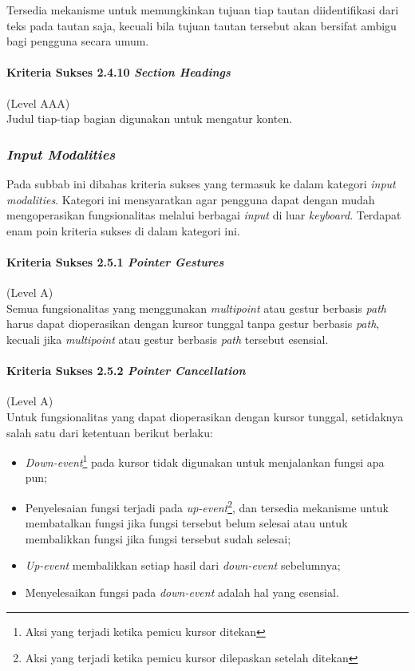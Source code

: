 Tersedia mekanisme untuk memungkinkan tujuan tiap tautan diidentifikasi dari teks pada tautan saja, kecuali bila tujuan tautan tersebut akan bersifat ambigu bagi pengguna secara umum.

\paragraph{Kriteria Sukses 2.4.10 \textit{Section Headings}}
\label{sec:kriteria_sukses_2.4.10}
(Level AAA)\\

Judul tiap-tiap bagian digunakan untuk mengatur konten.

\subsubsection{\textit{Input Modalities}}
\label{sec:input_modalities}
Pada subbab ini dibahas kriteria sukses yang termasuk ke dalam kategori \textit{input modalities}. Kategori ini mensyaratkan agar pengguna dapat dengan mudah mengoperasikan fungsionalitas melalui berbagai \textit{input} di luar \textit{keyboard}. Terdapat enam poin kriteria sukses di dalam kategori ini.

\paragraph{Kriteria Sukses 2.5.1 \textit{Pointer Gestures}}
\label{sec:kriteria_sukses_2.5.1}
(Level A)\\

Semua fungsionalitas yang menggunakan \textit{multipoint} atau gestur berbasis \textit{path} harus dapat dioperasikan dengan kursor tunggal tanpa gestur berbasis \textit{path}, kecuali jika \textit{multipoint} atau gestur berbasis \textit{path} tersebut esensial.

\paragraph{Kriteria Sukses 2.5.2 \textit{Pointer Cancellation}}
\label{sec:kriteria_sukses_2.5.2}
(Level A)\\

Untuk fungsionalitas yang dapat dioperasikan dengan kursor tunggal, setidaknya salah satu dari ketentuan berikut berlaku:
\begin{itemize}
	\item \textit{Down-event}\footnote{Aksi yang terjadi ketika pemicu kursor ditekan} pada kursor tidak digunakan untuk menjalankan fungsi apa pun;
	\item Penyelesaian fungsi terjadi pada \textit{up-event}\footnote{Aksi yang terjadi ketika pemicu kursor dilepaskan setelah ditekan}, dan tersedia mekanisme untuk membatalkan fungsi jika fungsi tersebut belum selesai atau untuk membalikkan fungsi jika fungsi tersebut sudah selesai;
	\item \textit{Up-event} membalikkan setiap hasil dari \textit{down-event} sebelumnya;
	\item Menyelesaikan fungsi pada \textit{down-event} adalah hal yang esensial.
\end{itemize}

